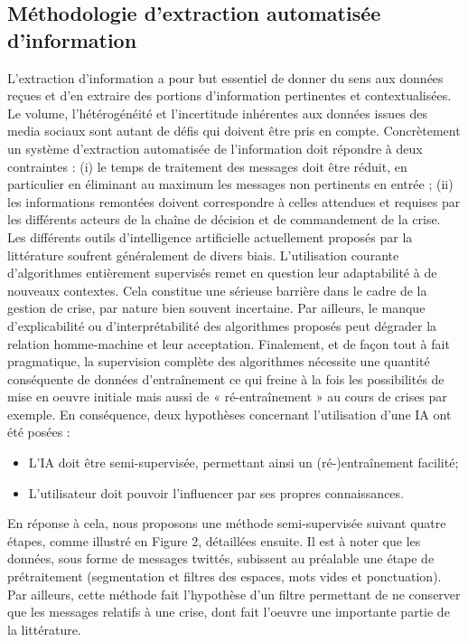 \subsection*{Méthodologie d'extraction automatisée d'information}
L'extraction d'information a pour but essentiel de donner du sens aux données
reçues et d'en extraire des portions d'information pertinentes et contextualisées.
Le volume, l'hétérogénéité et l'incertitude inhérentes aux données issues des media
sociaux sont autant de défis qui doivent être pris en compte. Concrètement un
système d'extraction automatisée de l'information doit répondre à deux contraintes :
(i) le temps de traitement des messages doit être réduit, en particulier en éliminant
au maximum les messages non pertinents en entrée ; (ii) les informations remontées
doivent correspondre à celles attendues et requises par les différents acteurs de la
chaîne de décision et de commandement de la crise. Les différents outils d'intelligence
artificielle actuellement proposés par la littérature soufrent généralement de divers
biais. L'utilisation courante d'algorithmes entièrement supervisés remet en question
leur adaptabilité à de nouveaux contextes. Cela constitue une sérieuse barrière dans le
cadre de la gestion de crise, par nature bien souvent incertaine. Par ailleurs, le manque
d'explicabilité ou d'interprétabilité des algorithmes proposés peut dégrader la relation
homme-machine et leur acceptation. Finalement, et de façon tout à fait pragmatique,
la supervision complète des algorithmes nécessite une quantité conséquente de
données d'entraînement ce qui freine à la fois les possibilités de mise en oeuvre initiale
mais aussi de « ré-entraînement » au cours de crises par exemple.
En conséquence, deux hypothèses concernant l'utilisation d'une IA ont été posées :
\begin{itemize}
    \item L'IA doit être semi-supervisée, permettant ainsi un (ré-)entraînement facilité;
    \item L'utilisateur doit pouvoir l'influencer par ses propres connaissances.
\end{itemize}

En réponse à cela, nous proposons une méthode semi-supervisée suivant quatre
étapes, comme illustré en Figure 2, détaillées ensuite. Il est à noter que les données,
sous forme de messages twittés, subissent au préalable une étape de prétraitement
(segmentation et filtres des espaces, mots vides et ponctuation). Par ailleurs, cette
méthode fait l'hypothèse d'un filtre permettant de ne conserver que les messages
relatifs à une crise, dont fait l'oeuvre une importante partie de la littérature.


